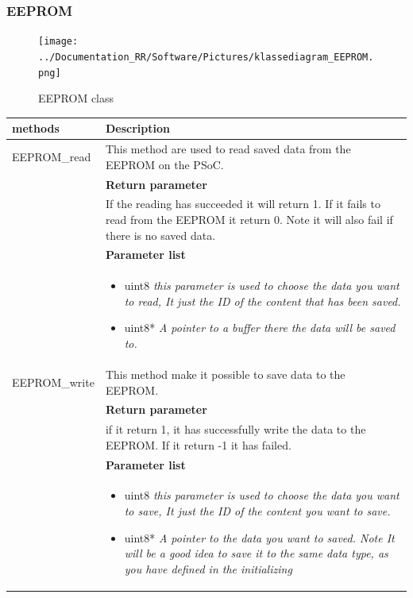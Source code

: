 \subsubsection{EEPROM}

\begin{figure}[H]
	\centering
	\texttt{[image: ../Documentation\_RR/Software/Pictures/klassediagram\_EEPROM.png]}
	\caption{EEPROM class}
	\label{fig:Class_diagram_EEPROM}
\end{figure}


\begin{table}[H]
	\centering
	\begin{tabular}{|p{5 cm}|p{10 cm}|}
		\hline
		\textbf{methods} & \textbf{Description} \\ \hline
		
		EEPROM\_read
		& This method are used to read saved data from the EEPROM on the PSoC.
		\\ & \textbf{Return parameter}
		\\ & If the reading has succeeded it will return 1. If it fails to read from the EEPROM it return 0. Note it will also fail if there is no saved data.
		\\ & \textbf{Parameter list}
		\\ & \begin{itemize}
			\item {\large uint8}
			\subitem \textit{this parameter is used to choose the data you want to read, It just the ID of the content that has been saved.}
			\item {\large uint8*}
			\subitem \textit{A pointer to a buffer there the data will be saved to.}
		\end{itemize}
		\\ \hline
		
		EEPROM\_write
		& This method make it possible to save data to the EEPROM.
		\\ & \textbf{Return parameter}
		\\ & if it return 1, it has successfully write the data to the EEPROM. If it return -1 it has failed.
		\\ & \textbf{Parameter list}
		\\ & \begin{itemize}
			\item {\large uint8}
			\subitem \textit{this parameter is used to choose the data you want to save, It just the ID of the content you want to save.}
			\item {\large uint8*}
			\subitem \textit{A pointer to the data you want to saved. Note It will be a good idea to save it to the same data type, as you have defined in the initializing}
		\end{itemize}
		\\ \hline
		

\end{tabular}
\end{table}
